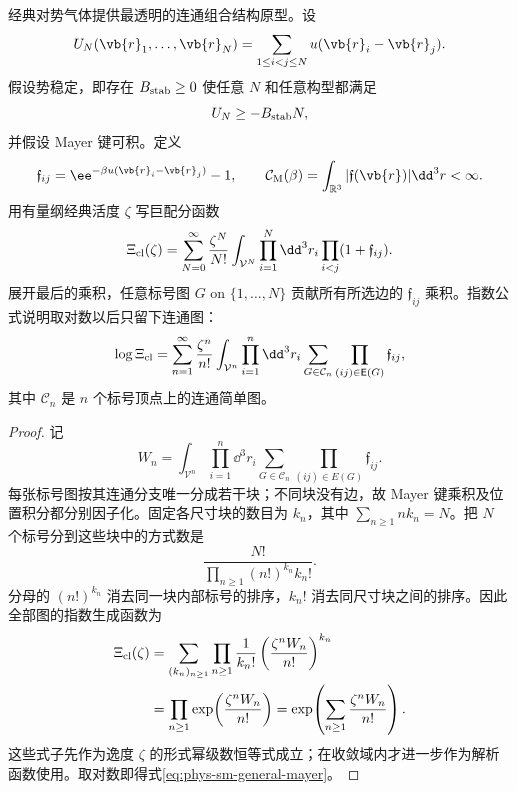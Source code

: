 经典对势气体提供最透明的连通组合结构原型。设
\[
 U_N(\vb{r}_1,\ldots,\vb{r}_N)
 =\sum_{1\le i<j\le N}u(\vb{r}_i-\vb{r}_j).
\]
假设势稳定，即存在 \(B_{\rm stab}\ge0\) 使任意 \(N\) 和任意构型都满足
\begin{equation}
 U_N\ge-B_{\rm stab}N,
 \label{eq:phys-sm-stable-potential}
\end{equation}
并假设 Mayer 键可积。定义
\begin{equation}
 \mathfrak f_{ij}=\ee^{-\beta u(\vb{r}_i-\vb{r}_j)}-1,
 \qquad
 \mathcal C_{\rm M}(\beta)=\int_{\mathbb R^3}|\mathfrak f(\vb{r})|\dd^3r<\infty.
 \label{eq:phys-sm-mayer-f}
\end{equation}
用有量纲经典活度 \(\zeta\) 写巨配分函数
\begin{equation}
 \Xi_{\rm cl}(\zeta)
 =\sum_{N=0}^{\infty}\frac{\zeta^N}{N!}
 \int_{\mathcal V^N}
 \prod_{i=1}^N\dd^3r_i
 \prod_{i<j}(1+\mathfrak f_{ij}).
 \label{eq:phys-sm-mayer-grand}
\end{equation}
展开最后的乘积，任意标号图 \(G\) on \(\{1,\ldots,N\}\) 贡献所有所选边的 \(\mathfrak f_{ij}\) 乘积。指数公式说明取对数以后只留下连通图：
\begin{equation}
 \log\Xi_{\rm cl}
 =\sum_{n=1}^{\infty}\frac{\zeta^n}{n!}
 \int_{\mathcal V^n}\prod_{i=1}^n\dd^3r_i
 \sum_{G\in\mathcal C_n}
 \prod_{(ij)\in\mathsf E(G)}\mathfrak f_{ij},
 \label{eq:phys-sm-general-mayer}
\end{equation}
其中 \(\mathcal C_n\) 是 \(n\) 个标号顶点上的连通简单图。

\begin{proof}
记
\[
W_n=\int_{\mathcal V^n}\prod_{i=1}^n\dd^3r_i
\sum_{G\in\mathcal C_n}\prod_{(ij)\in E(G)}\mathfrak f_{ij}.
\]
每张标号图按其连通分支唯一分成若干块；不同块没有边，故 Mayer 键乘积及位置积分都分别因子化。固定各尺寸块的数目为 \(k_n\)，其中 \(\sum_{n\ge1}nk_n=N\)。把 \(N\) 个标号分到这些块中的方式数是
\[
\frac{N!}{\prod_{n\ge1}(n!)^{k_n}k_n!}.
\]
分母的 \((n!)^{k_n}\) 消去同一块内部标号的排序，\(k_n!\) 消去同尺寸块之间的排序。因此全部图的指数生成函数为
\[
\begin{aligned}
\Xi_{\rm cl}(\zeta)
&=\sum_{(k_n)_{n\ge1}}
\prod_{n\ge1}
\frac1{k_n!}\left(\frac{\zeta^nW_n}{n!}\right)^{k_n}\\
&=\prod_{n\ge1}\exp\!\left(\frac{\zeta^nW_n}{n!}\right)
=\exp\!\left(\sum_{n\ge1}\frac{\zeta^nW_n}{n!}\right).
\end{aligned}
\]
这些式子先作为逸度 \(\zeta\) 的形式幂级数恒等式成立；在收敛域内才进一步作为解析函数使用。取对数即得式\cref{eq:phys-sm-general-mayer}。
\end{proof}

